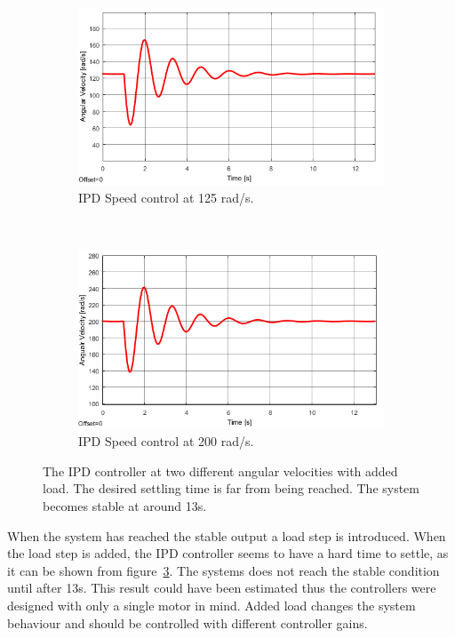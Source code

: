 \begin{figure}[h!]
	\centering
	\begin{subfigure}[b]{0.45\textwidth}
		\includegraphics[width=\textwidth]{graphics/IPD_load125}
		\caption{IPD Speed control at 125 rad/s.}
		\label{fig:ipdload125}
	\end{subfigure}
	~ %
	\begin{subfigure}[b]{0.45\textwidth}
		\includegraphics[width=\textwidth]{graphics/IPD_load200}
		\caption{IPD Speed control at 200 rad/s.}
		\label{fig:ipdload200}
	\end{subfigure}
	\caption{The IPD controller at two different angular velocities with added load. The desired settling time is far from being reached. The system becomes stable at around 13s.}
	\label{fig:ipdload}
\end{figure}

When the system has reached the stable output a load step is introduced.
When the load step is added, the IPD controller seems to have a hard time to settle, as it can be shown from figure~\ref{fig:ipdload}. The systems does not reach the stable condition until after 13s. This result could have been estimated thus the controllers were designed with only a single motor in mind. Added load changes the system behaviour and should be controlled with different controller gains.
